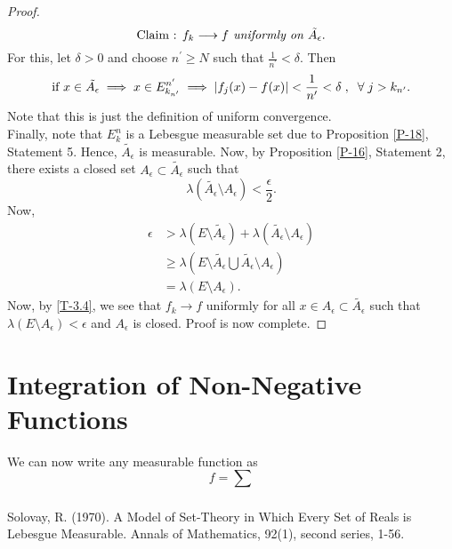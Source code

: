 \documentclass{article}
\theoremstyle{definition}
\theoremstyle{remark}
\theoremstyle{definition}
\theoremstyle{definition}
\theoremstyle{definition}
\DeclarePairedDelimiter\abs{\lvert}{\rvert}
\newcommand{\bunion}{\bigcup}
\newcommand{\lm}[1]{\lambda\left (#1\right )}
\begin{document}
\begin{proof}
\[\text{Claim : \textit{$ f_k \longrightarrow f $ uniformly on $ \tilde{A_\epsilon} $}.}\]
For this, let $ \delta > 0 $ and choose $ n^{\prime}\ge N $ such that $ \frac{1}{n^{\prime}} < \delta $. Then
\begin{equation}\label{T-3.4}
	\text{if } x\in \tilde{A_{\epsilon}} \implies x\in E_{k_{n^{\prime}}}^{n^{\prime}} \implies \abs{f_j(x) - f(x)} < \frac{1}{n^{\prime}} <\delta\;,\;\;\forall\;j > k_{n^{\prime}}.
\end{equation}
Note that this is just the definition of uniform convergence. \\
Finally, note that $ E_k^{n} $ is a Lebesgue measurable set due to Proposition \ref{P-18}, Statement 5. Hence, $ \tilde{A_\epsilon} $ is measurable. Now, by Proposition \ref{P-16}, Statement 2, there exists a closed set $ A_\epsilon \subset \tilde{A_\epsilon} $ such that \[\lm{\tilde{A_\epsilon} \setminus A_\epsilon} < \frac{\epsilon}{2}.\]
Now,
\begin{equation*}
	\begin{split}
	\epsilon &>	\lm{E\setminus \tilde{A_\epsilon} } + \lm{\tilde{A_\epsilon}\setminus A_\epsilon}\\
	&\ge \lm{E\setminus \tilde{A_\epsilon} \bunion \tilde{A_\epsilon}\setminus A_\epsilon}\\
	&= \lm{E\setminus A_\epsilon}.
	\end{split}
\end{equation*}
Now, by \eqref{T-3.4}, we see that $ f_k \longrightarrow f $ uniformly for all $ x\in A_\epsilon \subset \tilde{A_\epsilon} $ such that $ \lm{E\setminus A_\epsilon}< \epsilon $ and $ A_\epsilon $ is closed. Proof is now complete.
\end{proof}
\hrulefill
\newpage
\section{Integration of Non-Negative Functions}
We can now write any measurable function as 
\[f = \sum_{}\]
\newpage	
\begin{thebibliography}{9}
	Solovay, R. (1970). A Model of Set-Theory in Which Every Set of Reals is Lebesgue Measurable. Annals of Mathematics, 92(1), second series, 1-56.
\end{thebibliography}
\end{document}

